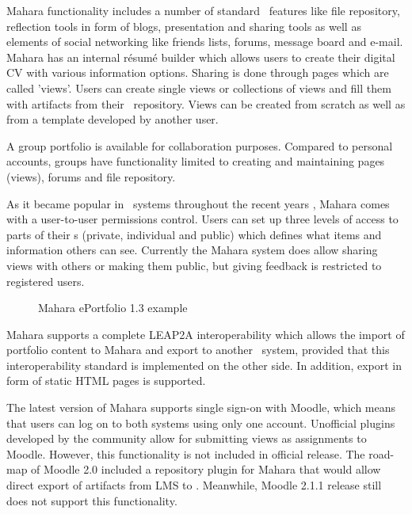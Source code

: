 Mahara functionality includes a number of standard \ep~features like file
repository, reflection tools in form of blogs, presentation and sharing tools as
well as elements of social networking like friends lists, forums, message board
and e-mail. Mahara has an internal r\'{e}sum\'{e} builder which allows users to
create their digital CV with various information options. Sharing is done
through pages which are called 'views'. Users can create single views or
collections of views and fill them with artifacts from their \ep~repository.
Views can be created from scratch as well as from a template developed by
another user.

A group portfolio is available for collaboration purposes. Compared to personal
accounts, groups have functionality limited to creating and maintaining pages
(views), forums and file repository.

As it became popular in \ep~systems throughout the recent years
\citep{Waters2009}, Mahara comes with a user-to-user permissions control. Users
can set up three levels of access to parts of their \ep s (private, individual
and public) which defines what items and information others can see. Currently
the Mahara system does allow sharing views with others or making them public,
but giving feedback is restricted to registered users.

\begin{figure}[htb]
\centering
\setlength\fboxsep{0pt}
\setlength\fboxrule{0.5pt}
\caption{Mahara ePortfolio 1.3 example}
\label{fig:maharaep}
\end{figure}

Mahara supports a complete LEAP2A interoperability
\citep{MaharaGovernanceGroup2011} which allows the import of portfolio content
to Mahara and export to another \ep~system, provided that this interoperability
standard is implemented on the other side. In addition, export in form of static
HTML pages is supported.

The latest version of Mahara supports single sign-on with Moodle, which means
that users can log on to both systems using only one account. Unofficial plugins
developed by the community allow for submitting views as assignments to Moodle.
However, this functionality is not included in official release. The road-map of
Moodle 2.0 included a repository plugin for Mahara that would allow direct
export of artifacts from LMS to \ep. Meanwhile, Moodle 2.1.1 release still does
not support this functionality.

